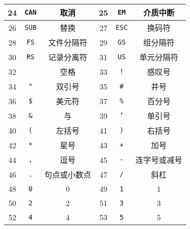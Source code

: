 \begin{longtable}{|c|c|c|c|c|c|}
        24   & \texttt{CAN}       & 取消              	& 25   & \texttt{EM}        & 介质中断        	\\
        \hline \rule{0pt}{15pt}
        26   & \texttt{SUB}       & 替换              	& 27   & \texttt{ESC}       & 换码符           	\\
        \hline \rule{0pt}{15pt}
        28   & \texttt{FS}        & 文件分隔符     	& 29   & \texttt{GS}        & 组分隔符        	\\
        \hline \rule{0pt}{15pt}
        30   & \texttt{RS}        & 记录分离符     	& 31   & \texttt{US}        & 单元分隔符     	\\
        \hline \rule{0pt}{15pt}
        32   &          & 空格              	& 33   & \texttt{!}         & 感叹号           	\\
        \hline \rule{0pt}{15pt}
        34   & \texttt{"}         & 双引号           	& 35   & \texttt{\#}         & 井号              	\\
        \hline \rule{0pt}{15pt}
        36   & \texttt{\$}         & 美元符           	& 37   & \texttt{\%}         & 百分号           	\\
        \hline \rule{0pt}{15pt}
        38   & \texttt{\&}         & 与                 	& 39   & \texttt{'}         & 单引号           	\\
        \hline \rule{0pt}{15pt}
        40   & \texttt{(}         & 左括号           	& 41   & \texttt{)}         & 右括号           	\\
        \hline \rule{0pt}{15pt}
        42   & \texttt{*}         & 星号              	& 43   & \texttt{+}         & 加号              	\\
        \hline \rule{0pt}{15pt}
        44   & \texttt{,}         & 逗号              	& 45   & \texttt{-}         & 连字号或减号  	\\
        \hline \rule{0pt}{15pt}
        46   & \texttt{.}         & 句点或小数点  	& 47   & \texttt{/}         & 斜杠              	\\
        \hline \rule{0pt}{15pt}
        48   & \texttt{0}         & 0                   	& 49   & \texttt{1}         & 1                   	\\
        \hline \rule{0pt}{15pt}
        50   & \texttt{2}         & 2                   	& 51   & \texttt{3}         & 3                   	\\
        \hline \rule{0pt}{15pt}
        52   & \texttt{4}         & 4                   	& 53   & \texttt{5}         & 5                   	\\

\end{longtable}

